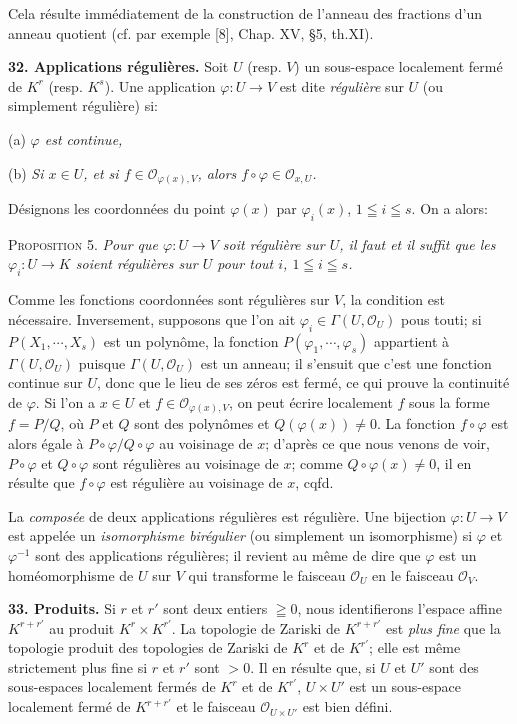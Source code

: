 Cela résulte immédiatement de la construction de l'anneau des fractions d'un anneau quotient (cf. par exemple [8], Chap. XV, §5, th.XI).

\textbf{32. Applications régulières.} Soit $U$ (resp. $V$) un sous-espace localement fermé de $K^r$ (resp. $K^s$). Une application $\varphi\colon U \to V$ est dite \textit{régulière} sur $U$ (ou simplement régulière) si:

(a) \textit{$\varphi$ est continue,}

(b) \textit{Si $x \in U$, et si $f \in \mathcal{O}_{\varphi(x),V}$, alors $f \circ \varphi \in \mathcal{O}_{x,U}$.}

Désignons les coordonnées du point $\varphi(x)$ par $\varphi_i(x)$, $1 \leqq i \leqq s$. On a alors:

\textsc{Proposition 5.} \textit{Pour que $\varphi\colon U \to V$ soit régulière sur $U$, il faut et il suffit que les $\varphi_i\colon U \to K$ soient régulières sur $U$ pour tout $i$, $1 \leqq i \leqq s$.}

Comme les fonctions coordonnées sont régulières sur $V$, la condition est nécessaire. Inversement, supposons que l'on ait $\varphi_i \in \Gamma(U, \mathcal{O}_U)$ pous touti; si $P(X_1, \cdots, X_s)$ est un polynôme, la fonction $P(\varphi_1, \cdots, \varphi_s)$ appartient à $\Gamma(U, \mathcal{O}_U)$ puisque $\Gamma(U, \mathcal{O}_U)$ est un anneau; il s'ensuit que c'est une fonction continue sur $U$, donc que le lieu de ses zéros est fermé, ce qui prouve la continuité de $\varphi$. Si l'on a $x \in U$ et $f \in \mathcal{O}_{\varphi(x),V}$, on peut écrire localement $f$ sous la forme $f = P/Q$, où $P$ et $Q$ sont des polynômes et $Q(\varphi(x)) \neq 0$. La fonction $f \circ \varphi$ est alors égale à $P \circ \varphi/Q \circ \varphi$ au voisinage de $x$; d'après ce que nous venons de voir, $P \circ \varphi$ et $Q \circ \varphi$ sont régulières au voisinage de $x$; comme $Q \circ \varphi(x) \neq 0$, il en résulte que $f \circ \varphi$ est régulière au voisinage de $x$, cqfd.

La \textit{composée} de deux applications régulières est régulière. Une bijection $\varphi\colon U \to V$ est appelée un \textit{isomorphisme birégulier} (ou simplement un isomorphisme) si $\varphi$ et $\varphi^{-1}$ sont des applications régulières; il revient au même de dire que $\varphi$ est un homéomorphisme de $U$ sur $V$ qui transforme le faisceau $\mathcal{O}_U$ en le faisceau $\mathcal{O}_V$.

\textbf{33. Produits.} Si $r$ et $r'$ sont deux entiers $\geqq 0$, nous identifierons l'espace affine $K^{r+r'}$ au produit $K^r \times K^{r'}$. La topologie de Zariski de $K^{r+r'}$ est \textit{plus fine} que la topologie produit des topologies de Zariski de $K^r$ et de $K^{r'}$; elle est même
strictement plus fine si $r$ et $r'$ sont $>0$. Il en résulte que, si $U$ et $U'$ sont des sous-espaces localement fermés de $K^r$ et de $K^{r'}$, $U \times U'$ est un sous-espace localement fermé de $K^{r+r'}$ et le faisceau $\mathcal{O}_{U \times U'}$ est bien défini.

